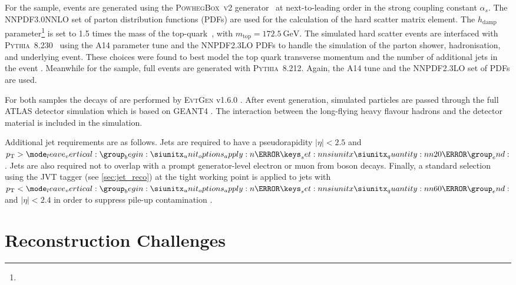 
For the \ttbar sample, events are generated using the \textsc{PowhegBox}~\textsc{v2} generator~\cite{powheg2004, powheg2007, powheg2007_2, powheg2010} at next-to-leading order in the strong coupling constant $\alpha_s$.
The NNPDF3.0NNLO \cite{Ball:2014uwa} set of parton distribution functions (PDFs) are used for the calculation of the hard scatter matrix element.
The $h_\text{damp}$ parameter\footnote{\hdampFootnote} is set to 1.5 times the mass of the top-quark~\cite{ATL-PHYS-PUB-2016-020}, with $m_\text{top} = \SI{172.5}{\GeV}$.
The simulated hard scatter events are interfaced with \textsc{Pythia}~8.230~\cite{Sjostrand:2014zea} using the A14 parameter tune and the NNPDF2.3LO PDFs to handle the simulation of the parton shower, hadronisation, and underlying event.
These choices were found to best model the top quark transverse momentum and the number of additional jets in the event \cite{ATL-PHYS-PUB-2016-020,ATL-PHYS-PUB-2020-023}.
Meanwhile for the \Zprime sample, full events are generated with \textsc{Pythia}~8.212.
Again, the A14 tune \cite{ATL-PHYS-PUB-2014-021} and the NNPDF2.3LO set of PDFs \cite{Ball:2012cx} are used.

For both samples the decays of \bchadrons are performed by \textsc{EvtGen} v1.6.0 \cite{Lange:2001uf}.
After event generation, simulated particles are passed through the full ATLAS detector simulation \cite{SOFT-2010-01} which is based on GEANT4 \cite{Agostinelli:2002hh}.
The interaction between the long-flying heavy flavour hadrons and the detector material is included in the simulation.

Additional jet requirements are as follows.
Jets are required to have a pseudorapidity $|\eta| < 2.5$ and $\pt > \SI{20}{\GeV}$.
Jets are also required not to overlap with a prompt generator-level electron or muon from \Wboson boson decays.
Finally, a standard selection using the JVT tagger (see \cref{sec:jet_reco}) at the tight working point is applied to jets with $\pt < \SI{60}{\GeV}$ and $|\eta| < 2.4$ in order to suppress pile-up contamination \cite{ATLAS-CONF-2014-018}.



\section{\texorpdfstring{\bhadron}{b-hadron} Reconstruction Challenges}
\label{sec:b_had_reco_chall}

